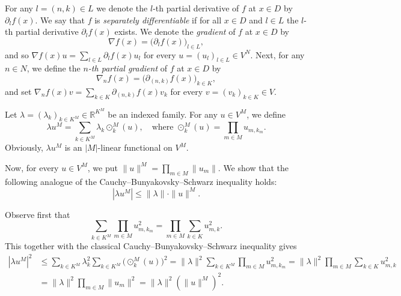 \documentclass{amsart}
\theoremstyle{plain}%
\theoremstyle{definition}
\theoremstyle{remark}
\begin{document}
For any $l=(n,k)\in L$ we denote the $l$\nobreakdash-th partial derivative of $f$ at $x\in D$ by $\partial_lf(x)$. We say that $f$ is
\emph{separately differentiable} if for all $x\in D$ and $l\in L$ the $l$\nobreakdash-th partial derivative $\partial_lf(x)$ exists. We denote the \emph{gradient} of $f$ at $x\in D$ by
\begin{equation*}
\nabla f(x)=\big(\partial_lf(x)\big)_{l\in L},
\end{equation*}
and so $\nabla f(x)u=\sum_{l\in L}\partial_lf(x)u_l$ for every $u=(u_l)_{l\in L}\in V^N$.
Next, for any $n\in N$, we define the \emph{$n$\nobreakdash-th partial gradient} of $f$ at $x\in D$ by
\begin{equation*}\label{nderel}
\nabla\!_n f(x)=\big(\partial_{(n,k)}f(x)\big)_{k\in K},
\end{equation*}
and set $\nabla\!_n f(x)v=\sum_{k\in K}\partial_{(n,k)} f(x)v_k$ for every $v=(v_k)_{k\in K}\in V$.

Let $\lambda=(\lambda_k)_{k\in K^M}\in\mathbb{R}^{K^M}$ be an indexed family. For any $u\in V^M$, we define
\begin{equation}\label{equ:notation_lambda_xN}
\lambda u ^M =\sum_{k\in K^M}\lambda_k \odot^M_k(u),\quad\text{where } 
\odot_k^M(u)=\prod_{m\in M}u_{m,k_m}.
\end{equation}
Obviously, $\lambda u^M$  is an $|M|$\nobreakdash-linear functional on $V^M$.

Now, for every $u\in V^M$, we put $\|u\|^M =\prod_{m\in M}\|u_{m}\|$. We show that the following analogue of the Cauchy–Bunyakovsky–Schwarz inequality holds:
\begin{equation}\label{equ:CBSinequality}
\left|\lambda u^M \right|\le \|\lambda\|\cdot \|u\|^M.
\end{equation}

Observe first that
\begin{equation*}
\sum_{k\in K^M}\prod_{m\in M}u_{m,k_m}^2=\prod_{m\in M}\sum_{k\in K}u_{m,k}^2.  
\end{equation*}
This together with the classical Cauchy–Bunyakovsky–Schwarz inequality gives
\begin{align*}
\left|\lambda u^M \right|^2
&\!\leq\sum_{k\in K^M} \lambda_k^2\sum_{k\in K^M}\!\big(\!\odot^M_k(u)\big)^2
=\|\lambda\|^2\sum_{k\in K^M}\prod_{m\in M}u_{m,k_m}^2
=\|\lambda\|^2\prod_{m\in M}\sum_{k\in K}u_{m,k} ^2\\
&=\|\lambda\|^2\prod_{m\in M}\|u_{m} \|^2
=\|\lambda\|^2 \left(\|u\|^M\right)^2.
\end{align*}
\end{document}
